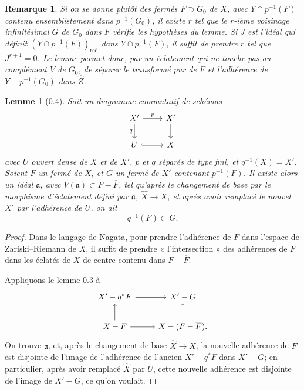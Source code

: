 \documentclass[11pt]{article}
\newtheorem*{lemma}{Lemme}
\newtheorem*{remark}{Remarque}
\newcommand{\wh}[1]{\widehat{#1}}
\begin{document}
\begin{remark}
Si on se donne plutôt des fermés \(F\supset G_0\) de \(X\), avec \(Y\cap p^{-1}(F)\) contenu ensemblistement dans \(p^{-1}(G_0)\), il existe \(r\) tel que le \(r\)-ième voisinage infinitésimal \(G\) de \(G_0\) dans \(F\) vérifie les hypothèses du lemme. Si \(J\) est l'idéal qui définit \((Y\cap p^{-1}(F))_{\mathrm{red}}\) dans \(Y\cap p^{-1}(F)\), il suffit de prendre \(r\) tel que \(J^{r+1}=0\). Le lemme permet donc, par un éclatement qui ne touche pas au complément \(V\) de \(G_0\), de séparer le transformé pur de \(F\) et l'adhérence de \(Y-p^{-1}(G_0)\) dans \(\wh Z\).
\end{remark}

\begin{lemma}[0.4]
Soit un diagramme commutatif de schémas
\[
\begin{tikzcd}
X' \ar[r,"p"] \ar[d,"q"'] & X' \ar[d] \\
U \ar[r,hook] & X
\end{tikzcd}
\]
avec \(U\) ouvert dense de \(X\) et de \(X'\), \(p\) et \(q\) séparés de type fini, et \(q^{-1}(X)=X'\). Soient \(F\) un fermé de \(X\), et \(G\) un fermé de \(X'\) contenant \(p^{-1}(F)\). Il existe alors un idéal \(\mathfrak a\), avec \(V(\mathfrak a)\subset F-\overline F\), tel qu'après le changement de base par le morphisme d'éclatement défini par \(\mathfrak a\), \(\wh X\to X\), et après avoir remplacé le nouvel \(X'\) par l'adhérence de \(U\), on ait
\[
q^{-1}(F)\subset G.
\]
\end{lemma}

\begin{proof}
Dans le langage de Nagata, pour prendre l'adhérence de \(F\) dans l'espace de Zariski--Riemann de \(X\), il suffit de prendre « l'intersection » des adhérences de \(F\) dans les éclatés de \(X\) de centre contenu dans \(F-\overline F\).

Appliquons le lemme 0.3 à
\[
\begin{tikzcd}
X'-q^*F \ar[r] & X'-G \\
X-F \ar[u] \ar[r] & X-(F-\overline F). \ar[u]
\end{tikzcd}
\]
On trouve \(\mathfrak a\), et, après le changement de base \(\wh X\to X\), la nouvelle adhérence de \(F\) est disjointe de l'image de l'adhérence de l'ancien \(X'-q^*F\) dans \(X'-G\); en particulier, après avoir remplacé \(\wh X\) par \(U\), cette nouvelle adhérence est disjointe de l'image de \(X'-G\), ce qu'on voulait.
\end{proof}
\end{document}
